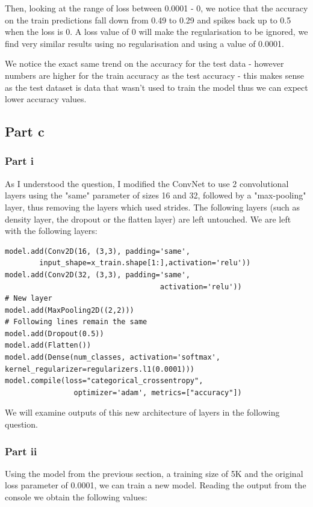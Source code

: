 \documentclass[10pt]{article}
\begin{document}
Then, looking at the range of loss between 0.0001 - 0, we notice that the accuracy on the train predictions
fall down from 0.49 to 0.29 and spikes back up to 0.5 when the loss is 0. A loss value of 0
will make the regularisation to be ignored, we find very similar results using no regularisation and using a value of
0.0001.

We notice the exact same trend on the accuracy for the test data - however numbers are higher for the train accuracy
as the test accuracy - this makes sense as the test dataset is data that wasn't used to train the model
thus we can expect lower accuracy values.

\subsection*{Part c}
\subsubsection*{Part i}
As I understood the question, I modified the ConvNet to use 2 convolutional layers
using the "same" parameter of sizes 16 and 32, followed by a "max-pooling" layer,
thus removing the layers which used strides. The following layers (such as 
density layer, the dropout or the flatten layer) are left untouched.
We are left with the following layers:

\begin{lstlisting}
model.add(Conv2D(16, (3,3), padding='same', 
        input_shape=x_train.shape[1:],activation='relu'))
model.add(Conv2D(32, (3,3), padding='same', 
                                    activation='relu'))
# New layer
model.add(MaxPooling2D((2,2)))
# Following lines remain the same
model.add(Dropout(0.5))
model.add(Flatten())
model.add(Dense(num_classes, activation='softmax',
kernel_regularizer=regularizers.l1(0.0001)))
model.compile(loss="categorical_crossentropy",
                optimizer='adam', metrics=["accuracy"])
\end{lstlisting}

We will examine outputs of this new architecture of layers in the following question.

\subsubsection*{Part ii}
Using the model from the previous section, a training size of 5K and the original loss
parameter of 0.0001, we can train a new model. Reading the output from the console
we obtain the following values:
\end{document}
